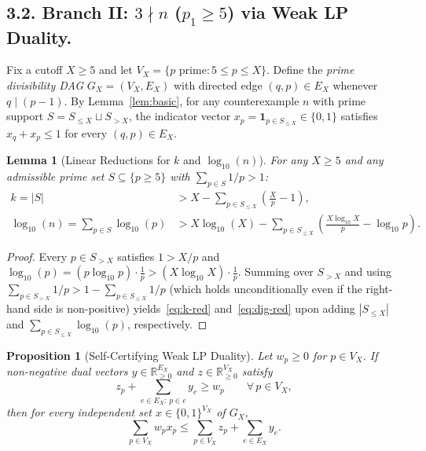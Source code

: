 \documentclass[11pt]{amsart}
\newtheorem{lemma}[theorem]{Lemma}
\newtheorem{proposition}[theorem]{Proposition}
\theoremstyle{definition}
\theoremstyle{remark}
\numberwithin{equation}{section}
\begin{document}
\subsection*{3.2. Branch II: $3 \nmid n$ ($p_1 \ge 5$) via Weak LP Duality.}
Fix a cutoff $X \ge 5$ and let $V_X = \{p \text{ prime} : 5 \le p \le X\}$. Define the \emph{prime divisibility DAG} $G_X = (V_X, E_X)$ with directed edge $(q, p) \in E_X$ whenever $q \mid (p - 1)$. By Lemma~\ref{lem:basic}, for any counterexample $n$ with prime support $S = S_{\le X} \sqcup S_{> X}$, the indicator vector $x_p = \mathbf{1}_{p \in S_{\le X}} \in \{0, 1\}$ satisfies $x_q + x_p \le 1$ for every $(q, p) \in E_X$.

\begin{lemma}[Linear Reductions for $k$ and $\log_{10}(n)$]\label{lem:lp-red}
For any $X \ge 5$ and any admissible prime set $S \subseteq \{p \ge 5\}$ with $\sum_{p \in S} 1/p > 1$:
\begin{align}
    k = |S| &> X - \sum_{p \in S_{\le X}} \left(\frac{X}{p} - 1\right), \label{eq:k-red} \\
    \log_{10}(n) = \sum_{p \in S} \log_{10}(p) &> X \log_{10}(X) - \sum_{p \in S_{\le X}} \left(\frac{X \log_{10} X}{p} - \log_{10} p\right). \label{eq:dig-red}
\end{align}
\end{lemma}

\begin{proof}
Every $p \in S_{> X}$ satisfies $1 > X/p$ and $\log_{10}(p) = (p \log_{10} p)\cdot \frac{1}{p} > (X \log_{10} X)\cdot \frac{1}{p}$. Summing over $S_{> X}$ and using $\sum_{p \in S_{> X}} 1/p > 1 - \sum_{p \in S_{\le X}} 1/p$ (which holds unconditionally even if the right-hand side is non-positive) yields~\eqref{eq:k-red} and~\eqref{eq:dig-red} upon adding $|S_{\le X}|$ and $\sum_{p \in S_{\le X}} \log_{10}(p)$, respectively.
\end{proof}

\begin{proposition}[Self-Certifying Weak LP Duality]\label{prop:dual}
Let $w_p \ge 0$ for $p \in V_X$. If non-negative dual vectors $y \in \mathbb{R}_{\ge 0}^{E_X}$ and $z \in \mathbb{R}_{\ge 0}^{V_X}$ satisfy
\begin{equation}\label{eq:dual-feas}
    z_p + \sum_{e \in E_X :\, p \in e} y_e \ge w_p \qquad \forall\, p \in V_X,
\end{equation}
then for every independent set $x \in \{0, 1\}^{V_X}$ of $G_X$,
\[
    \sum_{p \in V_X} w_p x_p \le \sum_{p \in V_X} z_p + \sum_{e \in E_X} y_e.
\]
\end{proposition}
\end{document}
